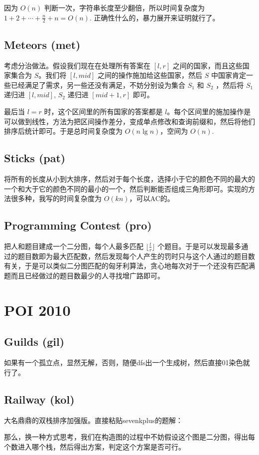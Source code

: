 \documentclass[a4paper,11pt]{article}
\begin{document}
因为 $O(n)$ 判断一次，字符串长度至少翻倍，所以时间复杂度为 $1+2+\cdots+\frac{n}{2}+n=O(n)$. 正确性什么的，暴力展开来证明就行了。
\subsection*{Meteors (met)}
考虑分治做法。假设我们现在在处理所有答案在 $[l, r]$ 之间的国家，而且这些国家集合为 $S$。我们将 $[l, mid]$ 之间的操作施加给这些国家，然后 $S$ 中国家肯定一些已经满足了需求，另一些还没有满足，不妨分别设为集合 $S_1$ 和 $S_2$ ，然后将 $S_1$ 递归进 $[l, mid]$, $S_2$ 递归进 $[mid + 1, r]$ 即可。

最后当 $l=r$ 时，这个区间里的所有国家的答案都是 $l$。每个区间里的施加操作是可以做到线性，方法为把区间操作差分，变成单点修改和查询前缀和，然后将他们排序后统计即可。于是总时间复杂度为 $O(n\lg n)$，空间为 $O(n)$.
\subsection*{Sticks (pat)}
将所有的长度从小到大排序，然后对于每个长度，选择小于它的颜色不同的最大的一个和大于它的颜色不同的最小的一个，然后判断能否组成三角形即可。实现的方法很多种，我写的时间复杂度为 $O(kn)$，可以AC的。

\subsection*{Programming Contest (pro)}
把人和题目建成一个二分图，每个人最多匹配 $\lfloor\frac{t}{r}\rfloor$ 个题目。于是可以发现最多通过的题目数即为最大匹配数，然后发现每个人产生的罚时只与这个人通过的题目数有关，于是可以类似二分图匹配的匈牙利算法，贪心地每次对于一个还没有匹配满题而且已经做过的题目数最少的人寻找增广路即可。

\section{POI 2010}
\subsection*{Guilds (gil)}
如果有一个孤立点，显然无解，否则，随便dfs出一个生成树，然后直接01染色就行了。
\subsection*{Railway (kol)}
大名鼎鼎的双栈排序加强版。直接粘贴sevenkplus的题解：

那么，换一种方式思考，我们在构造图的过程中不妨假设这个图是二分图，得出每个数进入哪个栈，然后得出方案，判定这个方案是否可行。
\end{document}
